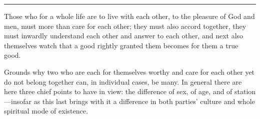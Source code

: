 \documentclass[12pt,a4paper]{book}
\begin{document}
\begin{center}\rule{0.28\linewidth}{0.4pt}\end{center}

Those who for a whole life are to live with each other, to the pleasure of
God and men, must more than care for each other; they must also accord
together, they must inwardly understand each other and answer to each
other, and next also themselves watch that a good rightly granted them
becomes for them a true good.

Grounds why two who are each for themselves worthy and care for each other
yet do not belong together can, in individual cases, be many. In general
there are here three chief points to have in view: the difference of sex,
of age, and of station---insofar as this last brings with it a difference in
both parties' culture and whole spiritual mode of existence.
\end{document}
